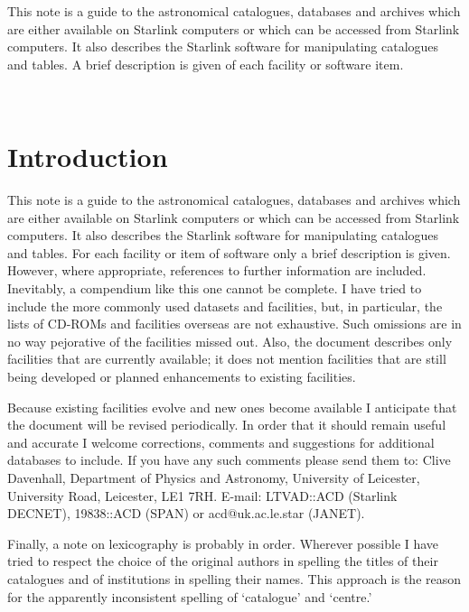 \documentclass[twoside,11pt]{article}
\newcommand{\stardocinitials}  {SUN}
\newcommand{\stardocnumber}    {162.1}
\newcommand{\stardocabstract}  {
This note is a guide to the astronomical catalogues, databases and
archives which are either available on Starlink computers or which can
be accessed from Starlink computers. It also describes the Starlink
software for manipulating catalogues and tables.
A brief description is given of each facility or software item.
}
\newcommand{\stardocname}{\stardocinitials /\stardocnumber}
\newenvironment{latexonly}{}{}
\newcommand{\xlabel}[1]{}
\renewcommand{\thepage}{\roman{page}}
\begin{document}
\stardocabstract
\newpage
\begin{latexonly}
   \setlength{\parskip}{0mm}
   \tableofcontents
   \setlength{\parskip}{\medskipamount}
   \markright{\stardocname}
\end{latexonly}
\newpage
~
\newpage
\renewcommand{\thepage}{\arabic{page}}
\setcounter{page}{1}

\section{Introduction\xlabel{introduction}}

This note is a guide to the astronomical catalogues, databases and
archives which are either available on Starlink computers or which can
be accessed from Starlink computers. It also describes the Starlink
software for manipulating catalogues and tables. For each facility or
item of software only a brief description is given. However, where
appropriate, references to further information are included. Inevitably,
a compendium like this one cannot be complete. I have tried to include
the more commonly used datasets and facilities, but, in particular, the
lists of CD-ROMs and facilities overseas are not exhaustive. Such
omissions are in no way pejorative of the facilities missed out. Also,
the document describes only facilities that are currently available; it
does not mention facilities that are still being developed or planned
enhancements to existing facilities.

Because existing facilities evolve and new ones become available I
anticipate that the document will be revised periodically. In order that
it should remain useful and accurate I welcome corrections, comments and
suggestions for additional databases to include. If you have any such
comments please send them to: Clive Davenhall, Department of Physics and
Astronomy, University of Leicester, University Road, Leicester, LE1 7RH.
E-mail: LTVAD::ACD (Starlink DECNET), 19838::ACD (SPAN) or
acd@uk.ac.le.star (JANET).

Finally, a note on lexicography is probably in order. Wherever possible
I have tried to respect the choice of the original authors in spelling
the titles of their catalogues and of institutions in spelling their
names. This approach is the reason for the apparently inconsistent
spelling of `catalogue' and `centre.'
\end{document}
